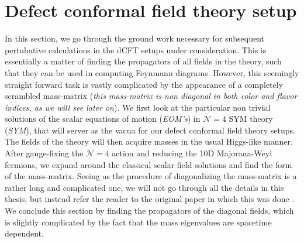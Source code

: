 %
\section{Defect conformal field theory setup}\label{sec:dCFT}
In this section, we go through the ground work necessary for subsequent pertubative calculations in the dCFT setups under consideration. This is essentially a matter of finding the propagators of all fields in the theory, such that they can be used in computing Feynmann diagrams. However, this seemingly straight forward task is vastly complicated by the appearance of a completely scrambled mass-matrix (\textit{this mass-matrix is non diagonal in both color and flavor indices, as we will see later on}). We first look at the particular non trivial solutions of the scalar equations of motion (\textit{EOM's}) in $\mathcal{N} = 4$ SYM theory (\textit{SYM}), that will server as the vacua for our defect conformal field theory setups. The fields of the theory will then acquire masses in the usual Higgs-like manner. After gauge-fixing the $\mathcal{N} = 4$ action and reducing the 10D Majorana-Weyl fermions, we expand around the classical scalar field solutions and find the form of the mass-matrix. Seeing as the procedure of diagonalizing the mass-matrix is a rather long and complicated one, we will not go through all the details in this thesis, but instead refer the reader to the original paper in which this was done \cite{One-point functions in D3-D7}. We conclude this section by finding the propagators of the diagonal fields, which is slightly complicated by the fact that the mass eigenvalues are spacetime dependent.


